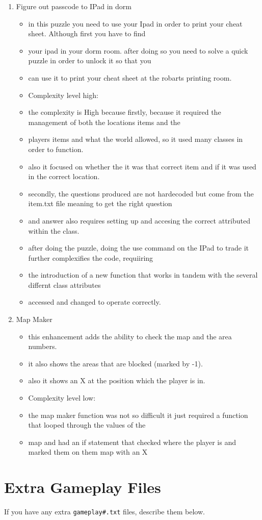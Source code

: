 \documentclass[11pt]{article}
\begin{document}
\begin{enumerate}
\item Figure out passcode to IPad in dorm
	\begin{itemize}
	\item in this puzzle you need to use your Ipad in order to print your cheat sheet. Although first you have to find
	\item your ipad in your dorm room. after doing so you need to solve a quick puzzle in order to unlock it so that you
	\item can use it to print your cheat sheet at the robarts printing room.
	\item Complexity level high:
	\item the complexity is High because firstly, because it required the management of both the locations items and the
	\item players items and what the world allowed, so it used many classes in order to function.
	\item also it focused on whether the it was that correct item and if it was used in the correct location.
	\item secondly, the questions produced are not hardecoded but come from the item.txt file meaning to get the right question
	\item and answer also requires setting up and accesing the correct attributed within the class.
	\item after doing the puzzle, doing the use command on the IPad to trade it further complexifies the code, requiiring
	\item the introduction of a new function that works in tandem with the several differnt class attributes
	\item accessed and changed to operate correctly.
	\end{itemize}


\item Map Maker
	\begin{itemize}
	\item this enhancement adds the ability to check the map and the area numbers.
	\item it also shows the areas that are blocked (marked by -1).
	\item also it shows an X at the position which the player is in.
	\item Complexity level low:
	\item the map maker function was not so difficult it just required a function that looped through the values of the
	\item map and had an if statement that checked where the player is and marked them on them map with an X
	\end{itemize}


\end{enumerate}


\section*{Extra Gameplay Files}

If you have any extra \texttt{gameplay\#.txt} files, describe them below.
\end{document}
